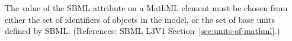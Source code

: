 The value of the SBML attribute  on a MathML 
element must be chosen from either the set of identifiers of
\UnitDefinition objects in the model, or the set of base units defined by
SBML.  (References: SBML L3V1 Section~\ref{sec:units-of-mathml}.)
